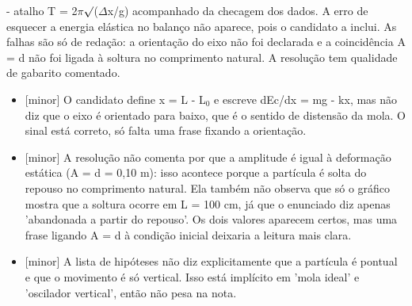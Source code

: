 \documentclass{article}%
\begin{document}
{-} atalho T = 2$\pi$$\surd$($\Delta$x/g) acompanhado da checagem dos dados.\newline%
\newline%
A erro de esquecer a energia elástica no balanço não aparece, pois o candidato a inclui. As falhas são só de redação: a orientação do eixo não foi declarada e a coincidência A = d não foi ligada à soltura no comprimento natural. A resolução tem qualidade de gabarito comentado.%
\begin{itemize}%
\item%
{[}minor{]} O candidato define x = L - L$_{0}$ e escreve dEc/dx = mg - kx, mas não diz que o eixo é orientado para baixo, que é o sentido de distensão da mola. O sinal está correto, só falta uma frase fixando a orientação.%
\item%
{[}minor{]} A resolução não comenta por que a amplitude é igual à deformação estática (A = d = 0,10 m): isso acontece porque a partícula é solta do repouso no comprimento natural. Ela também não observa que só o gráfico mostra que a soltura ocorre em L = 100 cm, já que o enunciado diz apenas 'abandonada a partir do repouso'. Os dois valores aparecem certos, mas uma frase ligando A = d à condição inicial deixaria a leitura mais clara.%
\item%
{[}minor{]} A lista de hipóteses não diz explicitamente que a partícula é pontual e que o movimento é só vertical. Isso está implícito em 'mola ideal' e 'oscilador vertical', então não pesa na nota.%
\end{itemize}%
\end{document}
